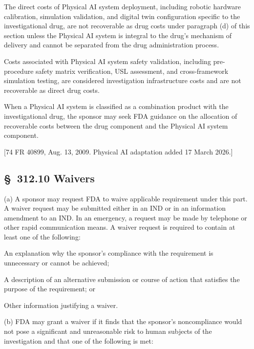 \documentclass[11pt]{article}
\begin{document}
\begin{description}[leftmargin=0.8cm,style=sameline]
\item[(i)] The direct costs of Physical AI system deployment, including robotic hardware calibration, simulation validation, and digital twin configuration specific to the investigational drug, are not recoverable as drug costs under paragraph (d) of this section unless the Physical AI system is integral to the drug's mechanism of delivery and cannot be separated from the drug administration process.
\item[(ii)] Costs associated with Physical AI system safety validation, including pre-procedure safety matrix verification, USL assessment, and cross-framework simulation testing, are considered investigation infrastructure costs and are not recoverable as direct drug costs.
\item[(iii)] When a Physical AI system is classified as a combination product with the investigational drug, the sponsor may seek FDA guidance on the allocation of recoverable costs between the drug component and the Physical AI system component.
\end{description}

[74 FR 40899, Aug. 13, 2009. Physical AI adaptation added 17 March 2026.]

\subsection{\S~312.10 Waivers}

(a) A sponsor may request FDA to waive applicable requirement under this part. A waiver request may be submitted either in an IND or in an information amendment to an IND. In an emergency, a request may be made by telephone or other rapid communication means. A waiver request is required to contain at least one of the following:

\begin{description}[leftmargin=0.5cm,style=sameline]
\item[(1)] An explanation why the sponsor's compliance with the requirement is unnecessary or cannot be achieved;
\item[(2)] A description of an alternative submission or course of action that satisfies the purpose of the requirement; or
\item[(3)] Other information justifying a waiver.
\end{description}

(b) FDA may grant a waiver if it finds that the sponsor's noncompliance would not pose a significant and unreasonable risk to human subjects of the investigation and that one of the following is met:
\end{document}
